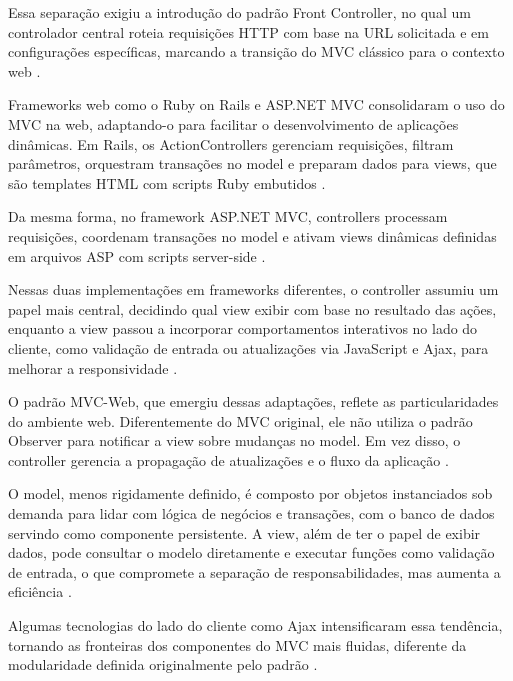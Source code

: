        \par Essa separação exigiu a introdução do padrão Front Controller, no qual um controlador central roteia requisições HTTP com base na URL solicitada e em configurações específicas, marcando a transição do MVC clássico para o contexto web \cite{inproceedings:grove:2011}.

        \par Frameworks web como o Ruby on Rails e ASP.NET MVC consolidaram o uso do MVC na web, adaptando-o para facilitar o desenvolvimento de aplicações dinâmicas. Em Rails, os ActionControllers gerenciam requisições, filtram parâmetros, orquestram transações no model e preparam dados para views, que são templates HTML com scripts Ruby embutidos \cite{inproceedings:grove:2011}.
        
        \par Da mesma forma, no framework ASP.NET MVC, controllers processam requisições, coordenam transações no model e ativam views dinâmicas definidas em arquivos ASP com scripts server-side \cite{inproceedings:grove:2011}. 

        \par Nessas duas implementações em frameworks diferentes, o controller assumiu um papel mais central, decidindo qual view exibir com base no resultado das ações, enquanto a view passou a incorporar comportamentos interativos no lado do cliente, como validação de entrada ou atualizações via JavaScript e Ajax, para melhorar a responsividade \cite{inproceedings:grove:2011}.

        \par O padrão MVC-Web, que emergiu dessas adaptações, reflete as particularidades do ambiente web. Diferentemente do MVC original, ele não utiliza o padrão Observer para notificar a view sobre mudanças no model. Em vez disso, o controller gerencia a propagação de atualizações e o fluxo da aplicação \cite{inproceedings:grove:2011}.
        
        \par O model, menos rigidamente definido, é composto por objetos instanciados sob demanda para lidar com lógica de negócios e transações, com o banco de dados servindo como componente persistente. A view, além de ter o papel de exibir dados, pode consultar o modelo diretamente e executar funções como validação de entrada, o que compromete a separação de responsabilidades, mas aumenta a eficiência \cite{inproceedings:grove:2011}. 
        
        \par Algumas tecnologias do lado do cliente como Ajax intensificaram essa tendência, tornando as fronteiras dos componentes do MVC mais fluidas, diferente da modularidade definida originalmente pelo padrão \cite{inproceedings:grove:2011}.

